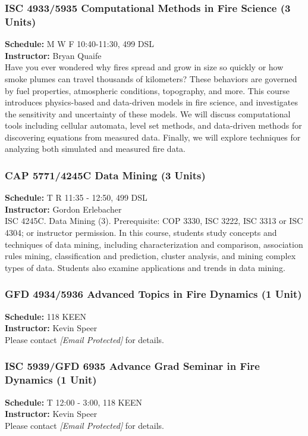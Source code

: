 \documentclass[12pt,a4paper]{article}
\begin{document}
\subsubsection*{ISC 4933/5935 Computational Methods in Fire Science (3 Units)}
\textbf{Schedule:} M W F 10:40-11:30, 499 DSL \\
\textbf{Instructor:} Bryan Quaife \\
Have you ever wondered why fires spread and grow in size so quickly or how smoke plumes can travel thousands of kilometers? These behaviors are governed by fuel properties, atmospheric conditions, topography, and more. This course introduces physics-based and data-driven models in fire science, and investigates the sensitivity and uncertainty of these models. We will discuss computational tools including cellular automata, level set methods, and data-driven methods for discovering equations from measured data. Finally, we will explore techniques for analyzing both simulated and measured fire data.

\subsubsection*{CAP 5771/4245C Data Mining (3 Units)}
\textbf{Schedule:} T R 11:35 - 12:50, 499 DSL \\
\textbf{Instructor:} Gordon Erlebacher \\
ISC 4245C. Data Mining (3). Prerequisite: COP 3330, ISC 3222, ISC 3313 or ISC 4304; or instructor permission. In this course, students study concepts and techniques of data mining, including characterization and comparison, association rules mining, classification and prediction, cluster analysis, and mining complex types of data. Students also examine applications and trends in data mining.

\subsubsection*{GFD 4934/5936 Advanced Topics in Fire Dynamics (1 Unit)}
\textbf{Schedule:} 118 KEEN \\
\textbf{Instructor:} Kevin Speer \\
Please contact \textit{[Email Protected]} for details.

\subsubsection*{ISC 5939/GFD 6935 Advance Grad Seminar in Fire Dynamics (1 Unit)}
\textbf{Schedule:} T 12:00 - 3:00, 118 KEEN \\
\textbf{Instructor:} Kevin Speer \\
Please contact \textit{[Email Protected]} for details.
\end{document}
